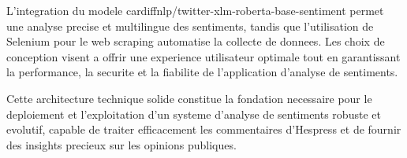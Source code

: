 L'integration du modele cardiffnlp/twitter-xlm-roberta-base-sentiment permet une analyse precise et multilingue des sentiments, tandis que l'utilisation de Selenium pour le web scraping automatise la collecte de donnees. Les choix de conception visent a offrir une experience utilisateur optimale tout en garantissant la performance, la securite et la fiabilite de l'application d'analyse de sentiments.

Cette architecture technique solide constitue la fondation necessaire pour le deploiement et l'exploitation d'un systeme d'analyse de sentiments robuste et evolutif, capable de traiter efficacement les commentaires d'Hespress et de fournir des insights precieux sur les opinions publiques.
